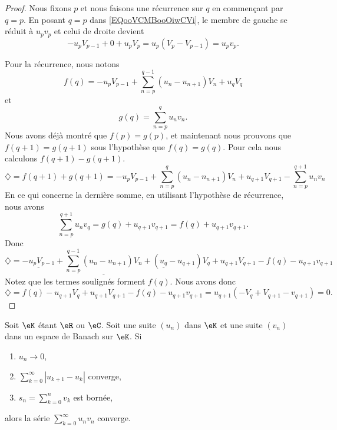 \begin{proof}
	Nous fixons \( p\) et nous faisons une récurrence sur \( q\) en commençant par \( q=p\). En posant \( q=p\) dans \eqref{EQooVCMBooOiwCVi}, le membre de gauche se réduit à \( u_pv_p\) et celui de droite devient
	\begin{equation}
		-u_pV_{p-1}+0+u_pV_p=u_p(V_p-V_{p-1})=u_pv_p.
	\end{equation}

	Pour la récurrence, nous notons
	\begin{equation}
		f(q)=-u_pV_{p-1}+\sum_{n=p}^{q-1}(u_n-u_{n+1})V_n+u_qV_q
	\end{equation}
	et
	\begin{equation}
		g(q)=\sum_{n=p}^qu_nv_n.
	\end{equation}
	Nous avons déjà montré que \( f(p)=g(p)\), et maintenant nous prouvons que \( f(q+1)=g(q+1)\) sous l'hypothèse que \( f(q)=g(q)\). Pour cela nous calculons \( f(q+1)-g(q+1)\).
	\begin{equation}
		\diamondsuit = f(q+1)+g(q+1)  =-u_pV_{p-1}+\sum_{n=p}^q(u_n-n_{n+1})V_n+u_{q+1}V_{q+1}-\sum_{n=p}^{q+1}u_nv_n
	\end{equation}
	En ce qui concerne la dernière somme, en utilisant l'hypothèse de récurrence, nous avons
	\begin{equation}
		\sum_{n=p}^{q+1}u_nv_q=g(q)+u_{q+1}v_{q+1}=f(q)+u_{q+1}v_{q+1}.
	\end{equation}
	Donc
	\begin{equation}
		\diamondsuit = \underline{-u_pV_{p-1}}+\underline{\sum_{n=p}^{q-1}(u_n-u_{n+1})V_n}+(\underline{u_q}-u_{q+1})V_q+u_{q+1}V_{q+1}-f(q)-u_{q+1}v_{q+1}
	\end{equation}
	Notez que les termes soulignés forment \( f(q)\). Nous avons donc
	\begin{equation}
		\diamondsuit=f(q)-u_{q+1}V_q+u_{q+1}V_{q+1}-f(q)-u_{q+1}v_{q+1}=u_{q+1}(-V_q+V_{q+1}-v_{q+1})=0.
	\end{equation}
\end{proof}

\begin{proposition}	\label{PROPooZELPooQrHBuv}
	Soit \( \eK\) étant \( \eR\) ou \( \eC\). Soit une suite \( (u_n)\) dans \( \eK\) et une suite \( (v_n)\) dans un espace de Banach sur \( \eK\). Si
	\begin{enumerate}
		\item
		      \( u_n\to 0\),
		\item		\label{ITEMooZAFCooSOaOXw}
		      \( \sum_{k=0}^{\infty}| u_{k+1}-u_k |\) converge,
		\item
		      \( s_n=\sum_{k=0}^{n}v_k\) est bornée,
	\end{enumerate}
	alors la série \( \sum_{k=0}^{\infty}u_nv_n\) converge.
\end{proposition}


